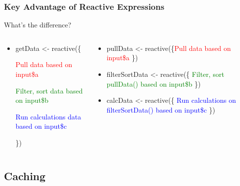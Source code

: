 \documentclass[
	11pt, %
]{beamer}
\begin{document}

\begin{frame}
	\frametitle{Key Advantage of Reactive Expressions}	
	
	What's the difference?	
	
	\begin{columns}
    \begin{column}{0.47\textwidth}
    \begin{itemize}        
        \item getData \textless- reactive(\{
        
			\indent \textcolor{red}{Pull data based on input\$a}
			
			\indent \textcolor{green}{Filter, sort data based on input\$b}		        

        	\indent \textcolor{blue}{Run calculations data based on input\$c}
        	
        \})
        \end{itemize}
    \end{column}
    \begin{column}{0.5\textwidth}
       
       \begin{itemize}
       \item pullData \textless- reactive(\{\textcolor{red}{Pull data based on input\$a} \})       
       \item filterSortData \textless- reactive(\{ \textcolor{green}{Filter, sort pullData() based on input\$b} \})       
	   \item calcData \textless- reactive(\{ \textcolor{blue}{Run calculations on filterSortData() based on input\$c} \})
       \end{itemize}       

       
    \end{column}
\end{columns}
	
\end{frame}

\subsection{Caching}
\end{document}
